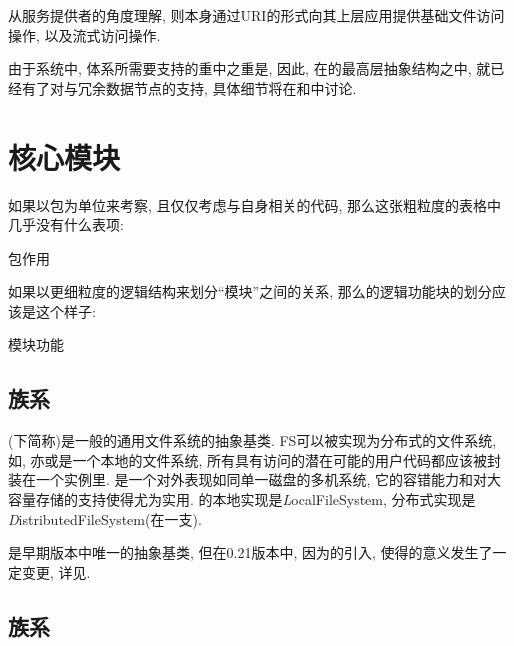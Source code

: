 从服务提供者的角度理解{\HFS}, 则{\HFS}本身通过URI的形式向其上层应用提供基础文件访问操作,
以及流式访问操作.

由于{\Hadoop}系统中, {\HFS}体系所需要支持的重中之重是{\HDFS}, 因此,
在{\HFS}的最高层抽象结构之中, 就已经有了对与冗余数据节点的支持,
具体细节将在和中讨论.

\section{核心模块}
\label{sec:hfs:modules}

如果以包为单位来考察{\HFS}, 且仅仅考虑与{\HFS}自身相关的代码,
那么这张粗粒度的表格中几乎没有什么表项:
\begin{XeDuoLineTabular}{包}{作用}
\end{XeDuoLineTabular}

如果以更细粒度的逻辑结构来划分``模块''之间的关系, 那么{\HFS}的逻辑功能块的划分应该是这个样子:
\begin{XeDuoLineTabular}{模块}{功能}
    \XeDLTItem{\dots}{\dots}
\end{XeDuoLineTabular}

\subsection{{\FiS}族系}
\label{ssec:hfs:fs}

{\FiS}(下简称{\FS})是一般的通用文件系统的抽象基类.
FS可以被实现为分布式的文件系统, 如{\HDFS}, 亦或是一个本地的文件系统,
所有具有访问{\HDFS}的潜在可能的用户代码都应该被封装在一个{\FiS}实例里.
{\HDFS}是一个对外表现如同单一磁盘的多机系统,
它的容错能力和对大容量存储的支持使得{\HDFS}尤为实用.
{\FiS}的本地实现是{\emph LocalFileSystem},
分布式实现是{\emph DistributedFileSystem}(在{\HDFS}一支).

{\FiS}是{\HadoopFS}早期版本中唯一的抽象基类, 但在0.21版本中,
因为{\AbsFS}的引入, 使得{\FiS}的意义发生了一定变更,
详见.

\subsection{\AbsFS 族系}
\label{ssec:hfs:afs}

